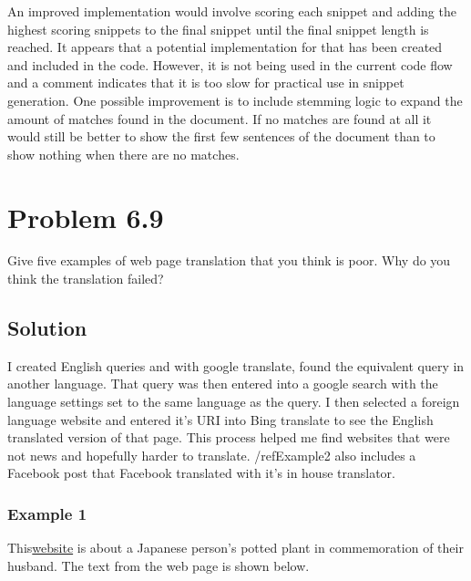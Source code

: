 \documentclass[letterpaper,12pt]{article}
\begin{document}
An improved implementation would involve scoring each snippet and adding the highest scoring snippets to the final snippet until the final snippet length is reached. It appears that a potential implementation for that has been created and included in the code. However, it is not being used in the current code flow and a comment indicates that it is too slow for practical use in snippet generation. One possible improvement is to include stemming logic to expand the amount of matches found in the document. If no matches are found at all it would still be better to show the first few sentences of the document than to show nothing when there are no matches.

\pagebreak


\section{Problem 6.9}

Give five examples of web page translation that you think is poor. Why do you think the translation failed?


\subsection{Solution}
I created English queries and with google translate, found the equivalent query in another language. That query was then entered into a google search with the language settings set to the same language as the query. I then selected a foreign language website and entered it's URI into Bing translate to see the English translated version of that page. This process helped me find websites that were not news and hopefully harder to translate. /ref{Example2} also includes a Facebook post that Facebook translated with it's in house translator.  

\subsubsection{Example 1}

This\href{https://kotobank.jp/word/\%E9\%89\%A2\%E6\%A4\%8D\%E3\%81\%88-601905}{website} is about a Japanese person's potted plant in commemoration of their husband. The text from the web page is shown below.
\end{document}
